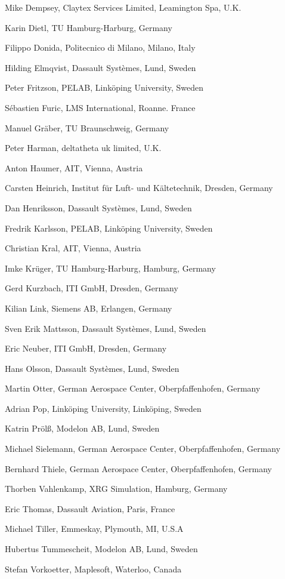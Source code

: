 Mike Dempsey, Claytex Services Limited, Leamington Spa, U.K.

Karin Dietl, TU Hamburg-Harburg, Germany

Filippo Donida, Politecnico di Milano, Milano, Italy

Hilding Elmqvist, Dassault Systèmes, Lund, Sweden

Peter Fritzson, PELAB, Linköping University, Sweden

Sébastien Furic, LMS International, Roanne. France

Manuel Gräber, TU Braunschweig, Germany

Peter Harman, deltatheta uk limited, U.K.

Anton Haumer, AIT, Vienna, Austria

Carsten Heinrich, Institut für Luft- und Kältetechnik, Dresden, Germany

Dan Henriksson, Dassault Systèmes, Lund, Sweden

Fredrik Karlsson, PELAB, Linköping University, Sweden

Christian Kral, AIT, Vienna, Austria

Imke Krüger, TU Hamburg-Harburg, Hamburg, Germany

Gerd Kurzbach, ITI GmbH, Dresden, Germany

Kilian Link, Siemens AB, Erlangen, Germany

Sven Erik Mattsson, Dassault Systèmes, Lund, Sweden

Eric Neuber, ITI GmbH, Dresden, Germany

Hans Olsson, Dassault Systèmes, Lund, Sweden

Martin Otter, German Aerospace Center, Oberpfaffenhofen, Germany

Adrian Pop, Linköping University, Linköping, Sweden

Katrin Prölß, Modelon AB, Lund, Sweden

Michael Sielemann, German Aerospace Center, Oberpfaffenhofen, Germany

Bernhard Thiele, German Aerospace Center, Oberpfaffenhofen, Germany

Thorben Vahlenkamp, XRG Simulation, Hamburg, Germany

Eric Thomas, Dassault Aviation, Paris, France

Michael Tiller, Emmeskay, Plymouth, MI, U.S.A

Hubertus Tummescheit, Modelon AB, Lund, Sweden

Stefan Vorkoetter, Maplesoft, Waterloo, Canada

